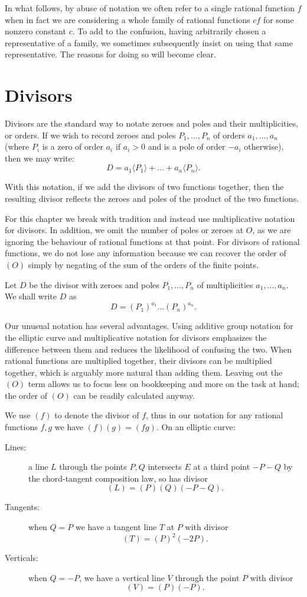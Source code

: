 In what follows, by abuse of notation we often refer to a single rational
function $f$ when in fact we are considering a whole family of rational
functions $c f$ for some nonzero constant $c$. To add to the confusion, having
arbitrarily chosen a representative of a family, we sometimes subsequently
insist on using that same representative. The reasons for doing so will become
clear.

\section {Divisors}

Divisors are the standard way to notate zeroes and poles and their
multiplicities, or orders. If we wish to record zeroes and poles $P_1,...,P_n$
of orders $a_1,...,a_n$ (where $P_i$ is a zero of order
$a_i$ if $a_i > 0$ and is a pole of order $-a_i$ otherwise), then
we may write:
\[ D = a_1\langle P_1\rangle + ... + a_n \langle P_n\rangle .\]

With this notation, if we add the divisors of two functions together,
then the resulting divisor reflects the zeroes and poles of the product
of the two functions.

For this chapter we break with tradition and instead use multiplicative
notation for divisors. In addition, we omit the number of poles or zeroes at
$O$, as we are ignoring the behaviour of rational functions at that point.
For divisors of rational functions, we do not lose any information because we
can recover the order of $(O)$ simply by negating of the sum of the orders of
the finite points.

Let $D$ be the divisor with zeroes and poles $P_1,...,P_n$
of multiplicities $a_1,...,a_n$. We shall write $D$ as
\[ D = (P_1)^{a_1} ... (P_n)^{a_n} . \]

Our unusual notation has several advantages. Using additive group notation for
the elliptic curve and multiplicative notation for divisors emphasizes the
difference between them and reduces the likelihood of confusing the two. When
rational functions are multiplied together, their divisors can be multiplied
together, which is arguably more natural than adding them. Leaving out the
$(O)$ term allows us to focus less on bookkeeping and more on the task at hand;
the order of $(O)$ can be readily calculated anyway.

We use $(f)$ to denote the divisor of $f$, thus in our notation
for any rational functions $f, g$ we have $(f)(g) = (f g)$.
On an elliptic curve:
\begin{description}
\item[Lines:]
a line $L$ through the points $P, Q$ intersects $E$ at a third point
$-P-Q$ by the chord-tangent composition law, so has divisor
\[ (L) = (P)(Q)(-P-Q) . \]
\item[Tangents:]
when $Q = P$ we have a tangent line $T$ at $P$ with divisor
\[ (T) = (P)^2 (-2P) . \]
\item[Verticals:]
when $Q = -P$, we have a vertical line $V$ through the point $P$
with divisor
\[ (V) = (P)(-P) . \]
\end{description}


